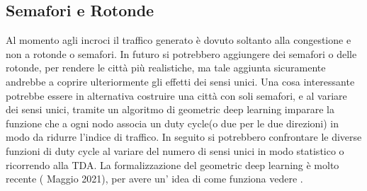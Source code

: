 \documentclass[main.tex]{subfiles}
\begin{document}
\subsection{Semafori e Rotonde}
Al momento agli incroci il traffico generato è dovuto soltanto alla congestione e non a rotonde o semafori.
In futuro si potrebbero aggiungere dei semafori o delle rotonde, per rendere le città più realistiche, ma tale aggiunta
sicuramente andrebbe a coprire ulteriormente gli effetti dei sensi unici.
Una cosa interessante potrebbe essere in alternativa costruire una città con soli semafori, e al variare dei sensi unici,
tramite un algoritmo di geometric deep learning imparare la funzione che a ogni nodo associa un duty cycle(o due per le due direzioni) in modo 
da ridurre l'indice di traffico. In seguito si potrebbero confrontare le diverse funzioni di duty cycle al variare del numero di sensi unici in modo statistico
o ricorrendo alla TDA.
La formalizzazione del geometric deep learning è molto recente ( Maggio 2021), per avere un' idea di come funziona vedere \cite{2021geo}.
\end{document}
